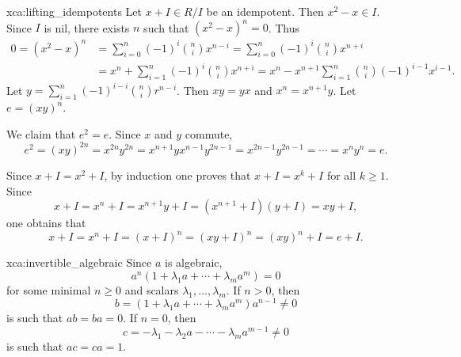 \begin{sol}{xca:lifting_idempotents}
    Let $x+I\in R/I$ be an idempotent. Then $x^2-x\in I$. Since $I$ is nil, 
    there exists $n$ such that $(x^2-x)^n=0$. Thus 
    \begin{align*}    
    0=(x^2-x)^n&=\sum_{i=0}^n (-1)^i\binom{n}{i}x^{n-i}
    =\sum_{i=0}^n(-1)^i\binom{n}{i}x^{n+i}\\
    &=x^n+\sum_{i=1}^n(-1)^i\binom{n}{i}x^{n+i}
    =x^n-x^{n+1}\sum_{i=1}^n\binom{n}{i}(-1)^{i-1}x^{i-1}.
    \end{align*}
    Let $y=\sum_{i=1}^n (-1)^{i-i}\binom{n}{i}r^{n-i}$. Then 
    $xy=yx$ and $x^n=x^{n+1}y$. Let $e=(xy)^n$. 

    We claim that $e^2=e$. Since $x$ and $y$ commute, 
    \[
    e^2=(xy)^{2n}=x^{2n}y^{2n}=x^{n+1}yx^{n-1}y^{2n-1}=x^{2n-1}y^{2n-1}=\cdots=x^ny^n=e.
    \]
    
    Since $x+I=x^2+I$, 
    by induction one proves that $x+I=x^k+I$ for all $k\geq1$. Since 
    \[
    x+I=x^n+I=x^{n+1}y+I=(x^{n+1}+I)(y+I)=xy+I, 
    \]
    one obtains that 
    \[
    x+I=x^n+I=(x+I)^n=(xy+I)^n=(xy)^n+I=e+I.
    \]
\end{sol}


\begin{sol}{xca:invertible_algebraic}
	Since $a$ is algebraic, 
	\[
		a^n(1+\lambda_1a+\cdots+\lambda_ma^m)=0
	\]
	for some minimal $n\geq0$ and scalars $\lambda_1,\dots,\lambda_m$. If  
	$n>0$, then 
	\[
	b=(1+\lambda_1a+\cdots+\lambda_ma^m)a^{n-1}\ne 0
	\]
	is such that $ab=ba=0$. If $n=0$, then  
	\[
		c=-\lambda_1-\lambda_2a-\cdots-\lambda_ma^{m-1}\ne 0
	\]
	is such that $ac=ca=1$. 
\end{sol}

